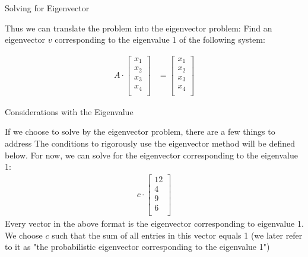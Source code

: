 \documentclass{beamer}
\begin{document}
\begin{frame}[t]{Solving for Eigenvector}
    \begin{outline}
        \1 Thus we can translate the problem into the eigenvector problem:
            \2 Find an eigenvector $v$ corresponding to the eigenvalue 1 of the following system:

        \begin{align*}
                A\cdot \begin{bmatrix}
                    x_1\\
                    x_2\\
                    x_3\\
                    x_4\\
                \end{bmatrix} &= \begin{bmatrix}
                    x_1\\
                    x_2\\
                    x_3\\
                    x_4\\
                \end{bmatrix}
        \end{align*}
    \end{outline}
\end{frame}

\begin{frame}[t]{Considerations with the Eigenvalue}
\begin{outline}
    \1 If we choose to solve by the eigenvector problem, there are a few things to address
    \1 The conditions to rigorously use the eigenvector method will be defined below. For now, we can solve for the eigenvector corresponding to the eigenvalue 1:
    \begin{align*}
        c\cdot \begin{bmatrix}
            12\\ 4\\ 9\\ 6\\
        \end{bmatrix}
    \end{align*}
    \1 Every vector in the above format is the eigenvector corresponding to eigenvalue 1. 
    \1 We choose $c$ such that the sum of all entries in this vector equals 1 (we later refer to it as "the probabilistic eigenvector corresponding to the eigenvalue 1")
\end{outline}
\end{frame}
\end{document}
